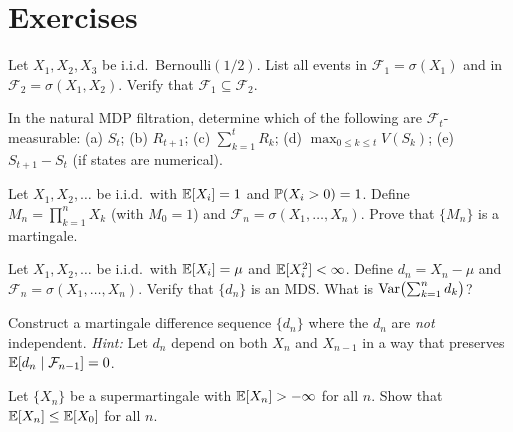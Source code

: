 \documentclass[11pt,a4paper]{article}
\begin{document}

\section{Exercises}
\label{sec:exercises}

\begin{exercise}
\label{ex:filtration_events}
Let $X_1, X_2, X_3$ be i.i.d.\ Bernoulli$(1/2)$.  List all
events in $\mathcal{F}_1 = \sigma(X_1)$ and in
$\mathcal{F}_2 = \sigma(X_1, X_2)$.  Verify that
$\mathcal{F}_1 \subseteq \mathcal{F}_2$.
\end{exercise}

\begin{exercise}
\label{ex:adapted_check}
In the natural MDP filtration, determine which of the following
are $\mathcal{F}_t$-measurable:
(a) $S_t$;
(b) $R_{t+1}$;
(c) $\sum_{k=1}^t R_k$;
(d) $\max_{0 \leq k \leq t} V(S_k)$;
(e) $S_{t+1} - S_t$ (if states are numerical).
\end{exercise}

\begin{exercise}
\label{ex:martingale_product}
Let $X_1, X_2, \ldots$ be i.i.d.\ with $\mathbb{E}[X_i] = 1$ and
$\mathbb{P}(X_i > 0) = 1$.  Define $M_n = \prod_{k=1}^n X_k$
(with $M_0 = 1$) and
$\mathcal{F}_n = \sigma(X_1, \ldots, X_n)$.  Prove that
$\{M_n\}$ is a martingale.
\end{exercise}

\begin{exercise}
\label{ex:mds_verification}
Let $X_1, X_2, \ldots$ be i.i.d.\ with $\mathbb{E}[X_i] = \mu$ and
$\mathbb{E}[X_i^2] < \infty$.  Define $d_n = X_n - \mu$ and
$\mathcal{F}_n = \sigma(X_1, \ldots, X_n)$.  Verify that
$\{d_n\}$ is an MDS.  What is
$\operatorname{Var}\bigl(\sum_{k=1}^n d_k\bigr)$?
\end{exercise}

\begin{exercise}
\label{ex:mds_not_iid}
Construct a martingale difference sequence $\{d_n\}$ where the
$d_n$ are \emph{not} independent.
\textit{Hint:} Let $d_n$ depend on both $X_n$ and $X_{n-1}$ in a
way that preserves $\mathbb{E}[d_n \mid \mathcal{F}_{n-1}] = 0$.
\end{exercise}

\begin{exercise}
\label{ex:supermartingale}
Let $\{X_n\}$ be a supermartingale with
$\mathbb{E}[X_n] > -\infty$ for all $n$.  Show that
$\mathbb{E}[X_n] \leq \mathbb{E}[X_0]$ for all $n$.
\end{exercise}
\end{document}

